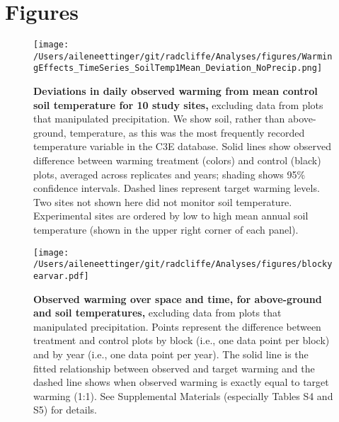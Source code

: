 \documentclass{article}
\begin{document}
\section* {Figures}
\clearpage
\begin{figure}[h]
\centering
 \texttt{[image: /Users/aileneettinger/git/radcliffe/Analyses/figures/WarmingEffects\_TimeSeries\_SoilTemp1Mean\_Deviation\_NoPrecip.png]}
 \caption{\textbf{Deviations in daily observed warming from mean control soil temperature for 10 study sites,} excluding data from plots that manipulated precipitation. We show soil, rather than above-ground, temperature, as this was the most frequently recorded temperature variable in the C3E database. Solid lines show observed difference between warming treatment (colors) and control (black) plots, averaged across replicates and years; shading shows 95\% confidence intervals. Dashed lines represent target warming levels. Two sites not shown here did not monitor soil temperature. Experimental sites are ordered by low to high mean annual soil temperature (shown in the upper right corner of each panel).} %
 \label{fig:effwarm}
 \end{figure}
 \begin{figure}[p]
   \centering
 \texttt{[image: /Users/aileneettinger/git/radcliffe/Analyses/figures/blockyearvar.pdf]}  
 \caption{\textbf{Observed warming over space and time, for above-ground and soil temperatures,} excluding data from plots that manipulated precipitation. Points represent the difference between treatment and control plots by block (i.e., one data point per block) and by year (i.e., one data point per year). The solid line is the fitted relationship between observed and target warming and the dashed line shows when observed warming is exactly equal to target warming (1:1). See Supplemental Materials (especially Tables S4 and S5) for details.}
 \label{fig:blockyear}
 \end{figure}
 
\end{document}
